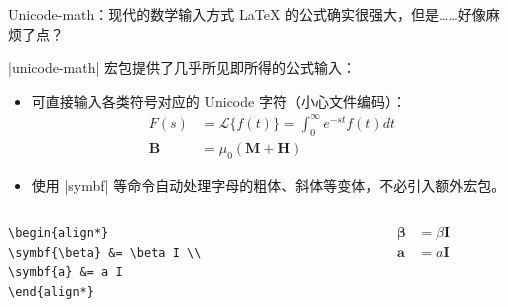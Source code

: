 \begin{frame}[fragile]{Unicode-math：现代的数学输入方式}
\LaTeX{} 的公式确实很强大，但是……好像麻烦了点？

|unicode-math| 宏包提供了几乎所见即所得的公式输入：

\begin{itemize}
  \item 可直接输入各类符号对应的 Unicode 字符（小心文件编码）：
  \begin{align*}
    𝐹(𝑠) &= ℒ\{𝑓(𝑡)\} = ∫_0^∞ e^{−𝑠𝑡} 𝑓(𝑡) d𝑡 \\
    𝐁 &= 𝜇_0(𝐌 + 𝐇)
  \end{align*}
  \item 使用 |symbf| 等命令自动处理字母的粗体、斜体等变体，不必引入额外宏包。
\end{itemize}

\begin{columns}[c]
  \begin{column}{0.45\textwidth}
    \begin{lstlisting}[basicstyle=\ttfamily]
\begin{align*}
\symbf{\beta} &= \beta I \\
\symbf{a} &= a I
\end{align*}
\end{lstlisting}
\end{column}\hspace{1em}
  \begin{column}{0.45\textwidth}
  \begin{align*}
      \symbf{\beta} &= \beta \symbf{I} \\
      \symbf{a} &= a \symbf{I}
  \end{align*}
  \end{column}
\end{columns}

\end{frame}

